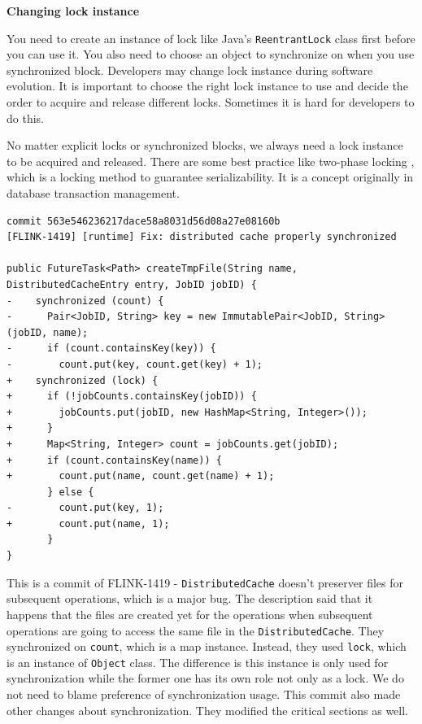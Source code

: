 \textbf{Changing lock instance}

You need to create an instance of lock like Java's \texttt{ReentrantLock} class first before you can use it. You also need to choose an object to synchronize on when you use synchronized block. Developers may change lock instance during software evolution. It is important to choose the right lock instance to use and decide the order to acquire and release different locks. Sometimes it is hard for developers to do this.

No matter explicit locks or synchronized blocks, we always need a lock instance to be acquired and released.  There are some best practice like two-phase locking \cite{journals/cacm/EswarranGLT76}, which is a locking method to guarantee serializability. It is a concept originally in database transaction management. %

\begin{lstlisting}
commit 563e546236217dace58a8031d56d08a27e08160b
[FLINK-1419] [runtime] Fix: distributed cache properly synchronized

public FutureTask<Path> createTmpFile(String name, DistributedCacheEntry entry, JobID jobID) {
-    synchronized (count) {
-      Pair<JobID, String> key = new ImmutablePair<JobID, String>(jobID, name);
-      if (count.containsKey(key)) {
-        count.put(key, count.get(key) + 1);
+    synchronized (lock) {
+      if (!jobCounts.containsKey(jobID)) {
+        jobCounts.put(jobID, new HashMap<String, Integer>());
+      }
+      Map<String, Integer> count = jobCounts.get(jobID);
+      if (count.containsKey(name)) {
+        count.put(name, count.get(name) + 1);
       } else {
-        count.put(key, 1);
+        count.put(name, 1);
       }
}
\end{lstlisting}

This is a commit of FLINK-1419 - \texttt{DistributedCache} doesn't preserver files for subsequent operations, which is a major bug. The description said that it happens that the files are created yet for the operations when subsequent operations are going to access the same file in the \texttt{DistributedCache}. They synchronized on \texttt{count}, which is a map instance. Instead, they used \texttt{lock}, which is an instance of \texttt{Object} class. The difference is this instance is only used for synchronization while the former one has its own role not only as a lock. We do not need to blame preference of synchronization usage. This commit also made other changes about synchronization. They modified the critical sections as well.

